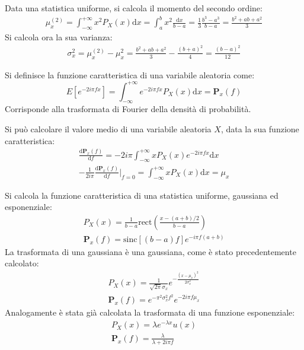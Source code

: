 \documentclass{article}
\newcommand{\rect}{\mathrm{rect}}
\newcommand{\sinc}{\mathrm{sinc}}
\newcommand{\df}{\mathrm{d}}
\numberwithin{equation}{subsection}
\begin{document}
Data una statistica uniforme, si calcola il momento del secondo ordine:
\begin{gather}
    \mu_x^{(2)}=\displaystyle\int_{-\infty}^{+\infty}x^2P_X(x)\df x=\int_a^bx^2\frac{\df x}{b-a}=\frac{1}{3}\frac{b^3-a^3}{b-a}=\frac{b^2+ab+a^2}{3}
\end{gather}
Si calcola ora la sua varianza:
\begin{gather}
    \sigma_x^2=\mu_x^{(2)}-\mu_x^2=\displaystyle\frac{b^2+ab+a^2}{3}-\frac{(b+a)^2}{4}=\frac{(b-a)^2}{12}
\end{gather}



Si definisce la funzione caratteristica di una variabile aleatoria come:
\begin{equation}
    E\left[e^{-2i\pi fx}\right]=\displaystyle\int_{-\infty}^{+\infty}e^{-2i\pi fx}P_X(x)\df x=\mathbf{P}_x(f)
\end{equation}
Corrisponde alla trasformata di Fourier della densità di probabilità. 

Si può calcolare il valore medio di una variabile aleatoria $X$, data la sua funzione caratteristica:
\begin{gather*}
    \displaystyle\frac{\df\mathbf{P}_x(f)}{\df f}=-2i\pi\int_{-\infty}^{+\infty}xP_X(x)e^{-2i\pi fx}\df x\\
    \displaystyle-\frac{1}{2i\pi}\frac{\df\mathbf{P}_x(f)}{\df f}\bigg|_{f=0}=\int_{-\infty}^{+\infty}xP_X(x)\df x=\mu_x
\end{gather*}

Si calcola la funzione caratteristica di una statistica uniforme, gaussiana ed esponenziale:
\begin{gather*}
    P_X(x)=\displaystyle\frac{1}{b-a}\rect\left(\frac{x-(a+b)/2}{b-a}\right)\\
    \mathbf{P}_x(f)=\displaystyle\sinc\left[(b-a)f\right]e^{-i\pi f(a+b)}
\end{gather*}
La trasformata di una gaussiana è una gaussiana, come è stato precedentemente calcolato: 
\begin{gather*}
    P_X(x)=\frac{1}{\sqrt{2\pi}\sigma_x}e^{-\frac{(x-\mu_x)^2}{2\sigma_x^2}}\\
    \mathbf{P}_x(f)=e^{-\pi^2\sigma_x^2f^2}e^{-2i\pi f\mu_x}
\end{gather*}
Analogamente è stata già calcolata la trasformata di una funzione esponenziale: 
\begin{gather*}
    P_X(x)=\lambda e^{-\lambda x}u(x)\\
    \mathbf{P}_x(f)=\displaystyle\frac{\lambda}{\lambda+2i\pi f}
\end{gather*}
\end{document}

